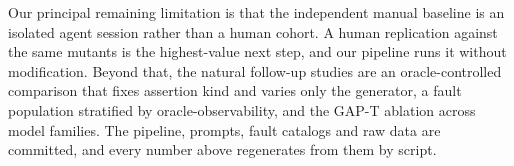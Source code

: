 Our principal remaining limitation is that the independent manual baseline is an isolated agent
session rather than a human cohort. A human replication against the same \RQIIn{} mutants is
the highest-value next step, and our pipeline runs it without modification. Beyond that, the
natural follow-up studies are an oracle-controlled comparison that fixes assertion kind and
varies only the generator, a fault population stratified by oracle-observability, and the GAP-T
ablation across model families. The pipeline, prompts, fault catalogs and raw data are
committed, and every number above regenerates from them by script.
